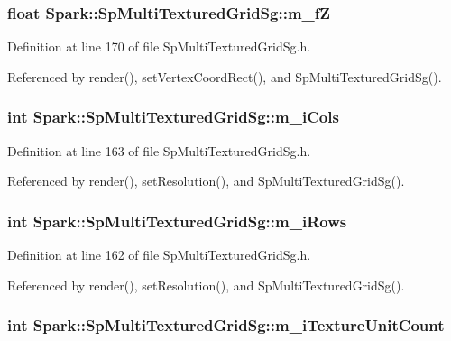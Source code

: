 \subsubsection{\setlength{\rightskip}{0pt plus 5cm}float {\bf Spark::Sp\-Multi\-Textured\-Grid\-Sg::m\_\-f\-Z}\hspace{0.3cm}{\tt  [protected]}}\label{classSpark_1_1SpMultiTexturedGridSg_p7}


Definition at line 170 of file Sp\-Multi\-Textured\-Grid\-Sg.h.

Referenced by render(), set\-Vertex\-Coord\-Rect(), and Sp\-Multi\-Textured\-Grid\-Sg().
\subsubsection{\setlength{\rightskip}{0pt plus 5cm}int {\bf Spark::Sp\-Multi\-Textured\-Grid\-Sg::m\_\-i\-Cols}\hspace{0.3cm}{\tt  [protected]}}\label{classSpark_1_1SpMultiTexturedGridSg_p2}


Definition at line 163 of file Sp\-Multi\-Textured\-Grid\-Sg.h.

Referenced by render(), set\-Resolution(), and Sp\-Multi\-Textured\-Grid\-Sg().
\subsubsection{\setlength{\rightskip}{0pt plus 5cm}int {\bf Spark::Sp\-Multi\-Textured\-Grid\-Sg::m\_\-i\-Rows}\hspace{0.3cm}{\tt  [protected]}}\label{classSpark_1_1SpMultiTexturedGridSg_p1}


Definition at line 162 of file Sp\-Multi\-Textured\-Grid\-Sg.h.

Referenced by render(), set\-Resolution(), and Sp\-Multi\-Textured\-Grid\-Sg().
\subsubsection{\setlength{\rightskip}{0pt plus 5cm}int {\bf Spark::Sp\-Multi\-Textured\-Grid\-Sg::m\_\-i\-Texture\-Unit\-Count}\hspace{0.3cm}{\tt  [protected]}}\label{classSpark_1_1SpMultiTexturedGridSg_p0}



